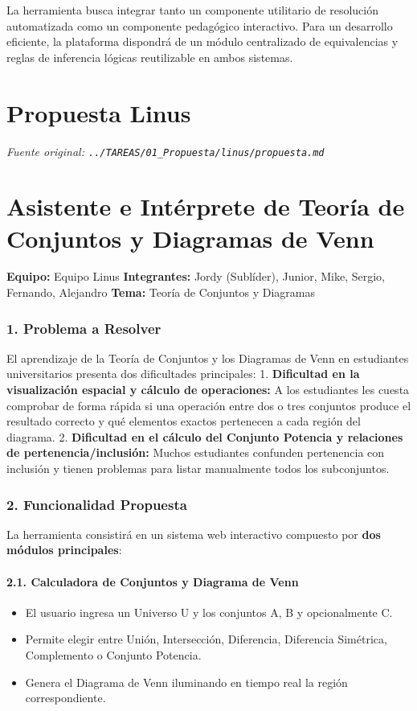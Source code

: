 \documentclass[11pt,a4paper,openany]{book}
\begin{document}
La herramienta busca integrar tanto un componente utilitario de resolución automatizada como un componente pedagógico interactivo. Para un desarrollo eficiente, la plataforma dispondrá de un módulo centralizado de equivalencias y reglas de inferencia lógicas reutilizable en ambos sistemas.


\section{Propuesta Linus}
\textit{Fuente original: \texttt{../TAREAS/01\_Propuesta/linus/propuesta.md}}

\section{Asistente e Intérprete de Teoría de Conjuntos y Diagramas de Venn}

\textbf{Equipo:} Equipo Linus
\textbf{Integrantes:} Jordy (Sublíder), Junior, Mike, Sergio, Fernando, Alejandro
\textbf{Tema:} Teoría de Conjuntos y Diagramas

\hrulefill

\subsubsection{1. Problema a Resolver}

El aprendizaje de la Teoría de Conjuntos y los Diagramas de Venn en estudiantes universitarios presenta dos dificultades principales:
1. \textbf{Dificultad en la visualización espacial y cálculo de operaciones:} A los estudiantes les cuesta comprobar de forma rápida si una operación entre dos o tres conjuntos produce el resultado correcto y qué elementos exactos pertenecen a cada región del diagrama.
2. \textbf{Dificultad en el cálculo del Conjunto Potencia y relaciones de pertenencia/inclusión:} Muchos estudiantes confunden pertenencia con inclusión y tienen problemas para listar manualmente todos los subconjuntos.

\hrulefill

\subsubsection{2. Funcionalidad Propuesta}

La herramienta consistirá en un sistema web interactivo compuesto por \textbf{dos módulos principales}:

\paragraph{2.1. Calculadora de Conjuntos y Diagrama de Venn}
\begin{itemize}[leftmargin=*]
\item El usuario ingresa un Universo U y los conjuntos A, B y opcionalmente C.
\item Permite elegir entre Unión, Intersección, Diferencia, Diferencia Simétrica, Complemento o Conjunto Potencia.
\item Genera el Diagrama de Venn iluminando en tiempo real la región correspondiente.
\end{itemize}
\end{document}
